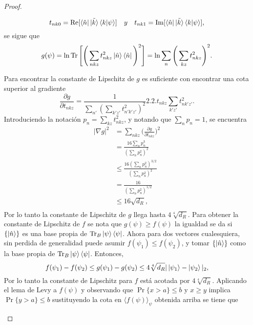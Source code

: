 \begin{proof}
\begin{enumerate}
\begin{equation}
t_{nk0}= \Re [ \bra{\hat{n}} \tilde{\ket{k}} \bra{k}\ket{\psi}] \quad y \quad  t_{nk1}= \Im [ \bra{\hat{n}} \tilde{\ket{k}} \bra{k}\ket{\psi}],
\end{equation}
se sigue que 
\begin{equation}
g(\psi)= \ln \Tr \Bigg[  \Bigg( \sum_{nkz} t_{nkz}^{2}  \ket{\hat{n}} \bra{\hat{n}}  \Bigg)^{2} \Bigg]= \ln \sum_{n} \Bigg( \sum_{kz} t_{nkz}^{2} \Bigg)^{2}.
\end{equation}

Para encontrar la constante de Lipschitz de $g$ es suficiente con encontrar una cota superior al gradiente 
\begin{equation}
\frac{\partial g}{\partial t_{nkz}}=\frac{1}{\sum_{n'} (\sum_{k'z'}t_{n'k'z'}^{2})^{2}} 2.2.t_{nkz} \sum_{k'z'}t_{nk'z'}^{2}.
\end{equation}
Introduciendo la notación $p_{n}=\sum_{kz}t_{nkz}^{2}$, y notando que $\sum_{n} p_{n}=1$, se encuentra 
\begin{align*}
|\nabla g|^{2} &= \sum_{nkz} \bigg(\frac{\partial g}{\partial t_{nkz}} \bigg )^{2} \\
&= \frac{16 \sum_{n} p_{n}^{3}}{(\sum_{n} p_{n}^{2})^{2}}\\
&\leq \frac{16(\sum_{n} p_{n}^{2})^{3/2}}{(\sum_{n} p_{n}^{2})^{2}}\\
&=\frac{16}{(\sum_{n} p_{n}^{2})^{1/2}}\\
&\leq 16 \sqrt{d_{R}},\\
\end{align*}
Por lo tanto la constante de Lipschitz de $g$ llega hasta $4 \sqrt[4]{d_{R}}$. Para obtener la constante de Lipschitz de $f$ se nota que $g(\psi) \geq f(\psi)$ la igualdad se da si $ \{ \ket{ \hat{n}} \} $ es una base  propia de $\Tr_{B} \ket{\psi}\bra{\psi}$. Ahora para dos vectores cualesquiera, sin perdida de generalidad puede asumir $f(\psi_{1}) \leq f(\psi_{2})$, y tomar $ \{ \ket{\hat{n}} \}$ como la base propia de $\Tr_{B} \ket{\psi}\bra{\psi}$. Entonces,
\begin{equation}
f(\psi_{1})- f(\psi_{2})\leq g(\psi_{1})- g(\psi_{2}) \leq 4\sqrt[4]{d_{R}} |\ket{\psi_{1}}-\ket{\psi_{2}}|_{2},
\end{equation}
Por lo tanto la constante de Lipschitz para $f$ está acotada por $4\sqrt[4]{d_{R}}$.
Aplicando el lema de Levy a $f(\psi)$ y  observando que $\Pr \{ x>a \} \leq b$ y $x \geq y$ implica $\Pr \{ y>a \} \leq b$  sustituyendo la cota en $\langle f(\psi) \rangle_{\psi}$ obtenida arriba se tiene que


\end{enumerate}
\end{proof}
